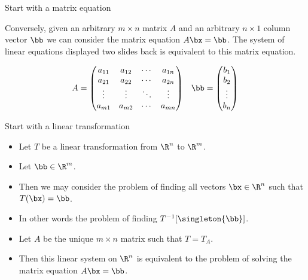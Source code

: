 \documentclass{beamer}
\begin{document}
\begin{frame}{Start with a matrix equation}

Conversely, given an arbitrary $m \times n$ matrix $A$ and an arbitrary
$n \times 1$ column vector $\bb$ we can consider the matrix equation
$A\bx = \bb$. The system of linear equations displayed two slides back
is equivalent to this matrix equation.

$$
\begin{matrix}
A =
\begin{pmatrix}
a_{11} & a_{12} & \cdots & a_{1n} \\
a_{21} & a_{22} & \cdots & a_{2n} \\
\vdots & \vdots & \ddots & \vdots \\
a_{m1} & a_{m2} & \cdots & a_{mn}
\end{pmatrix}
&
\bb =
\begin{pmatrix}
b_1 \\ b_2 \\ \vdots \\ b_n
\end{pmatrix}
\end{matrix}
$$

\end{frame}


\begin{frame}{Start with a linear transformation}

\begin{itemize}
\item Let $T$ be a linear transformation from $\R^n$ to $\R^m$.
\item Let $\bb\in \R^m$.
\item Then we may consider the problem of finding all vectors $\bx\in\R^n$
such that $T(\bx) = \bb$.
\item In other words the problem of finding $T^{-1}[\singleton{\bb}]$.
\item Let $A$ be the unique $m \times n$ matrix such that $T = T_A$.
\item Then this linear system on $\R^n$ is equivalent to the problem of
solving the matrix equation $A \bx = \bb$.
\end{itemize}

\end{frame}

\end{document}
